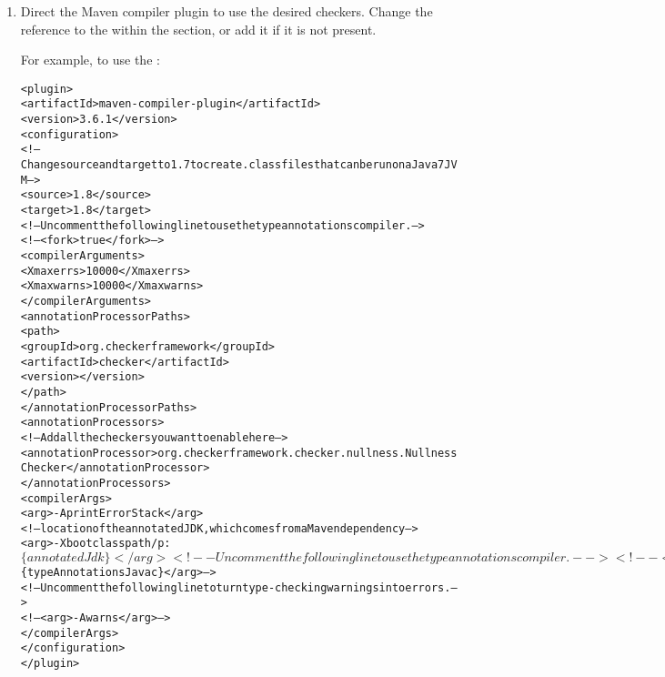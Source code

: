 {\begin{enumerate}
Change the reference to the  within the 
section, or add it if it is not present.

\begin{alltt}
  <plugin>
    <!-- This plugin will set properties values using dependency information -->
    <groupId>org.apache.maven.plugins</groupId>
    <artifactId>maven-dependency-plugin</artifactId>
    <executions>
      <execution>
        <goals>
          <goal>properties</goal>
        </goals>
      </execution>
    </executions>
  </plugin>
\end{alltt}


\item Direct the Maven compiler plugin to use the desired checkers.
Change the reference to the  within the 
section, or add it if it is not present.

For example, to use the :

\begin{mysmall}
\begin{alltt}
  <plugin>
    <artifactId>maven-compiler-plugin</artifactId>
    <version>3.6.1</version>
    <configuration>
      <!-- Change source and target to 1.7 to create .class files that can be run on a Java 7 JVM -->
      <source>1.8</source>
      <target>1.8</target>
      <!-- Uncomment the following line to use the type annotations compiler. -->
      <!-- <fork>true</fork> -->
      <compilerArguments>
        <Xmaxerrs>10000</Xmaxerrs>
        <Xmaxwarns>10000</Xmaxwarns>
      </compilerArguments>
      <annotationProcessorPaths>
        <path>
          <groupId>org.checkerframework</groupId>
          <artifactId>checker</artifactId>
          <version>\ReleaseVersion{}</version>
        </path>
      </annotationProcessorPaths>
      <annotationProcessors>
        <!-- Add all the checkers you want to enable here -->
        <annotationProcessor>org.checkerframework.checker.nullness.NullnessChecker</annotationProcessor>
      </annotationProcessors>
      <compilerArgs>
        <arg>-AprintErrorStack</arg>
        <!-- location of the annotated JDK, which comes from a Maven dependency -->
        <arg>-Xbootclasspath/p:$\{annotatedJdk\}</arg>
        <!-- Uncomment the following line to use the type annotations compiler. -->
        <!-- <arg>-J-Xbootclasspath/p:$\{typeAnnotationsJavac\}</arg> -->
        <!-- Uncomment the following line to turn type-checking warnings into errors. -->
        <!-- <arg>-Awarns</arg> -->
      </compilerArgs>
    </configuration>
  </plugin>
\end{alltt}
\end{mysmall}


\end{enumerate}}
